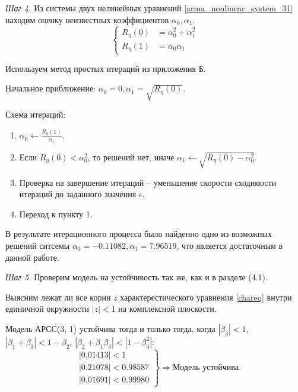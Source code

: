 \documentclass[12pt, fleqn]{article}
\begin{document}
{{{			\textit{Шаг 4.} Из системы двух нелинейных уравнений \eqref{arma_nonlinear_system_31} находим оценку неизвестных коэффициентов $\alpha_0, \alpha_1$.
			\begin{equation}\label{arma_nonlinear_system_31}
				\left\{
				\begin{split}
					R_{\eta}(0) &= \alpha_0^2 + \alpha_1^2 \\
					R_{\eta}(1) &= \alpha_0 \alpha_1
				\end{split}
				\right.
			\end{equation}
			
			Используем метод простых итераций из приложения Б.
			
			Начальное приближение: $\alpha_0 = 0, \alpha_1 = \sqrt{R_{\eta}(0)}$. \medskip
	  
			Схема итераций:
			\begin{enumerate}
					\item {$\alpha_0 \leftarrow \displaystyle\frac{R_{\eta}(1)}{\alpha_1}$.}
					\item {Если $R_{\eta}(0) < \alpha_0^2$, то решений нет, иначе $\alpha_1 \leftarrow \displaystyle\sqrt{R_{\eta}(0) - \alpha_0^2}$.}
					\item {Проверка на завершение итераций -- уменьшение скорости сходимости итераций до заданного значения $\epsilon$.}
					\item {Переход к пункту 1.}
			\end{enumerate}
	  
			В результате итерационного процесса было найденно одно из возможных решений ситсемы $\alpha_0 =-0.11082, \alpha_1 = 7.96519$, что является достаточным в данной работе.\medskip		  
			
			\textit{Шаг 5.} Проверим модель на устойчивость так же, как и в разделе (4.1).
			
			Выясним лежат ли все корни $z$ характерестического уравнения \eqref{chareq} внутри единичной окружности $ \left| z \right| < 1 $ на комплексной плоскости.
			
			Модель АРСС(3, 1) устойчива тогда и только тогда, когда $\left| \beta_3 \right| < 1$, $\left| \beta_1 + \beta_3 \right| < 1 - \beta_2$, $\left| \beta_2 + \beta_1 \beta_3 \right| < \left| 1 - \beta^2_3 \right|$:
				\begin{equation*}
					\left.
					\begin{split}
						&\left| 0.01413 \right| < 1 \\
						&\left| 0.21078 \right| < 0.98587 \\
						&\left| 0.01691 \right| < 0.99980
					\end{split}
					\right\} \Rightarrow \text{Модель устойчива}.
				\end{equation*}\medskip
				
}}}
\end{document}
